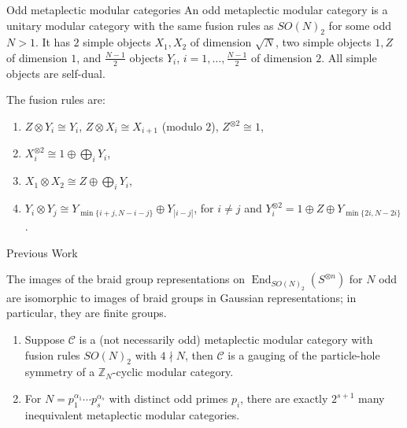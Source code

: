 \documentclass{beamer}
\DeclareMathOperator{\End}{End}
\begin{document}
\newcommand{\one}{1}{

\begin{frame}{Odd metaplectic modular categories}
  An odd metaplectic modular category is a unitary modular category with the same fusion rules as $SO(N)_2$ for some odd $N > 1$. It has $2$ simple objects $X_1, X_2$ of dimension $\sqrt{N}$, two simple objects $\one, Z$ of dimension $1$, and $\frac{N-1}{2}$ objects $Y_i$, $i=1,\ldots,\frac{N-1}{2}$ of dimension $2$. All simple objects are self-dual.

  The fusion rules are:
\begin{enumerate}
 \item $Z\otimes Y_i\cong Y_i$, $Z\otimes X_i\cong X_{i+1}$ (modulo $2$), $Z^{\otimes 2}\cong\one$,
 \item $X_i^{\otimes 2}\cong \one\oplus \bigoplus_{i} Y_i$,
 \item $X_1\otimes X_2\cong Z\oplus\bigoplus_{i} Y_i$,
 \item $Y_i\otimes Y_j\cong Y_{\min\{i+j,N-i-j\}}\oplus Y_{|i-j|}$, for $i\neq j$ and $Y_i^{\otimes 2}=\one\oplus Z\oplus Y_{\min\{2i,N-2i\}}$.
\end{enumerate}

\end{frame}

\newcommand{\ot}{\otimes}

\begin{frame}{Previous Work}
\begin{theorem}
The images of the braid group representations on $\End_{SO(N)_2}(S^{\otimes n})$ for $N$ odd are isomorphic to images of braid groups in Gaussian representations; in particular, they are finite groups.
\end{theorem}

\begin{theorem}
\begin{enumerate}
\item Suppose $\mathcal{C}$ is a (not necessarily odd) metaplectic modular category with fusion rules $SO(N)_2$ with $4 \nmid N$, then $\mathcal{C}$ is a gauging of the particle-hole symmetry of a $\mathbb{Z}_N$-cyclic modular category.
\item For $N=p_1^{\alpha_1}\cdots p_s^{\alpha_s}$ with distinct odd primes $p_i$, there are exactly $2^{s+1}$ many inequivalent metaplectic modular categories.
\end{enumerate}
\end{theorem}
\end{frame}

}
\end{document}
